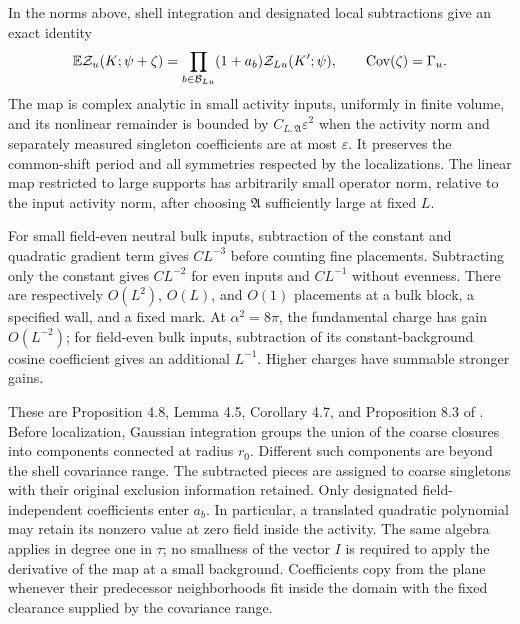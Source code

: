 \begin{proposition}\label{inp:partition-map}
In the norms above, shell integration and designated local
subtractions give an exact identity
\begin{equation}\label{inp:exact-map}
 \mathbb E\mathcal Z_u(K;\psi+\zeta)
   =\prod_{b\in\mathcal B_{Lu}}(1+a_b)
                                      \mathcal Z_{Lu}(K';\psi),
 \qquad \operatorname{Cov}(\zeta)=\Gamma_u.
\end{equation}
The map is complex analytic in small activity inputs, uniformly in
finite volume, and its nonlinear remainder is bounded by
\(C_{L,\mathfrak A}\varepsilon^2\) when the activity norm and
separately measured singleton coefficients are at most \(\varepsilon\).
It preserves the common-shift period and all symmetries respected by
the localizations.  The linear map restricted to large supports has
arbitrarily small operator norm, relative to the input activity norm,
after choosing \(\mathfrak A\) sufficiently large at fixed \(L\).

For small field-even neutral bulk inputs, subtraction of the constant
and quadratic gradient term gives \(CL^{-3}\) before counting fine placements.
Subtracting only the constant gives \(CL^{-2}\) for even inputs
and \(CL^{-1}\) without evenness.  There are respectively
\(O(L^2)\), \(O(L)\), and \(O(1)\) placements at a bulk block,
a specified wall, and a fixed mark.  At \(\alpha^2=8\pi\), the
fundamental charge has gain \(O(L^{-2})\); for field-even bulk inputs,
subtraction of its constant-background cosine coefficient gives an
additional \(L^{-1}\).
Higher charges have summable stronger gains.
\end{proposition}

These are Proposition 4.8, Lemma 4.5, Corollary 4.7, and
Proposition 8.3 of \cite{B}.
Before localization, Gaussian integration groups the union of the
coarse closures into components connected at radius \(r_0\).
Different such components are beyond the shell covariance range.
The subtracted pieces are assigned to coarse singletons with their
original exclusion information retained.  Only designated
field-independent coefficients enter \(a_b\).  In particular, a
translated quadratic polynomial may retain its nonzero value at zero
field inside the activity.  The same algebra applies in degree one
in \(\tau\); no smallness of the vector \(I\) is required to apply
the derivative of the map at a small background.  Coefficients copy
from the plane whenever their predecessor neighborhoods fit inside
the domain with the fixed clearance supplied by the covariance range.

